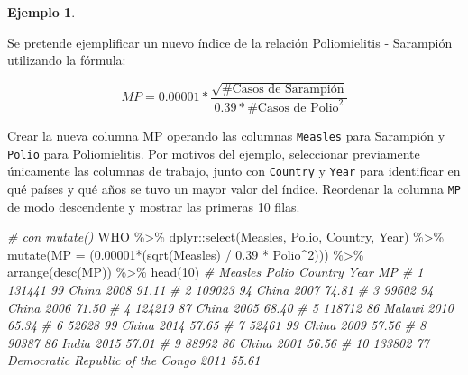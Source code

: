 \documentclass[
]{article}
\newenvironment{Shaded}{\begin{snugshade}}{\end{snugshade}}
\newcommand{\AttributeTok}[1]{\textcolor[rgb]{0.77,0.63,0.00}{#1}}
\newcommand{\CommentTok}[1]{\textcolor[rgb]{0.56,0.35,0.01}{\textit{#1}}}
\newcommand{\DecValTok}[1]{\textcolor[rgb]{0.00,0.00,0.81}{#1}}
\newcommand{\FloatTok}[1]{\textcolor[rgb]{0.00,0.00,0.81}{#1}}
\newcommand{\FunctionTok}[1]{\textcolor[rgb]{0.00,0.00,0.00}{#1}}
\newcommand{\NormalTok}[1]{#1}
\newcommand{\SpecialCharTok}[1]{\textcolor[rgb]{0.00,0.00,0.00}{#1}}
\theoremstyle{definition}
\theoremstyle{definition}
\newtheorem{example}{Ejemplo}[section]
\theoremstyle{definition}
\theoremstyle{definition}
\theoremstyle{remark}
\begin{document}
\begin{example}
\protect\hypertarget{exm:summariseall}{}\label{exm:summariseall}

Se pretende ejemplificar un nuevo índice de la relación Poliomielitis - Sarampión utilizando la fórmula:

\[MP = 0.00001*\frac{\sqrt{\text{#Casos de Sarampión}}}{0.39*\text{#Casos de Polio}^2} \]

Crear la nueva columna MP operando las columnas \texttt{Measles} para Sarampión y \texttt{Polio} para Poliomielitis. Por motivos del ejemplo, seleccionar previamente únicamente las columnas de trabajo, junto con \texttt{Country} y \texttt{Year} para identificar en qué países y qué años se tuvo un mayor valor del índice. Reordenar la columna \texttt{MP} de modo descendente y mostrar las primeras 10 filas.

\begin{Shaded}
\begin{Highlighting}[]
\CommentTok{\# con mutate()}
\NormalTok{WHO }\SpecialCharTok{\%\textgreater{}\%} 
\NormalTok{  dplyr}\SpecialCharTok{::}\FunctionTok{select}\NormalTok{(Measles, Polio, Country, Year) }\SpecialCharTok{\%\textgreater{}\%} 
  \FunctionTok{mutate}\NormalTok{(}\AttributeTok{MP =}\NormalTok{ (}\FloatTok{0.00001}\SpecialCharTok{*}\NormalTok{(}\FunctionTok{sqrt}\NormalTok{(Measles) }\SpecialCharTok{/} \FloatTok{0.39} \SpecialCharTok{*}\NormalTok{ Polio}\SpecialCharTok{\^{}}\DecValTok{2}\NormalTok{))) }\SpecialCharTok{\%\textgreater{}\%} 
  \FunctionTok{arrange}\NormalTok{(}\FunctionTok{desc}\NormalTok{(MP)) }\SpecialCharTok{\%\textgreater{}\%} 
  \FunctionTok{head}\NormalTok{(}\DecValTok{10}\NormalTok{)}
\CommentTok{\#    Measles Polio                          Country Year    MP}
\CommentTok{\# 1   131441    99                            China 2008 91.11}
\CommentTok{\# 2   109023    94                            China 2007 74.81}
\CommentTok{\# 3    99602    94                            China 2006 71.50}
\CommentTok{\# 4   124219    87                            China 2005 68.40}
\CommentTok{\# 5   118712    86                           Malawi 2010 65.34}
\CommentTok{\# 6    52628    99                            China 2014 57.65}
\CommentTok{\# 7    52461    99                            China 2009 57.56}
\CommentTok{\# 8    90387    86                            India 2015 57.01}
\CommentTok{\# 9    88962    86                            China 2001 56.56}
\CommentTok{\# 10  133802    77 Democratic Republic of the Congo 2011 55.61}


\end{Highlighting}
\end{Shaded}
\end{example}
\end{document}
